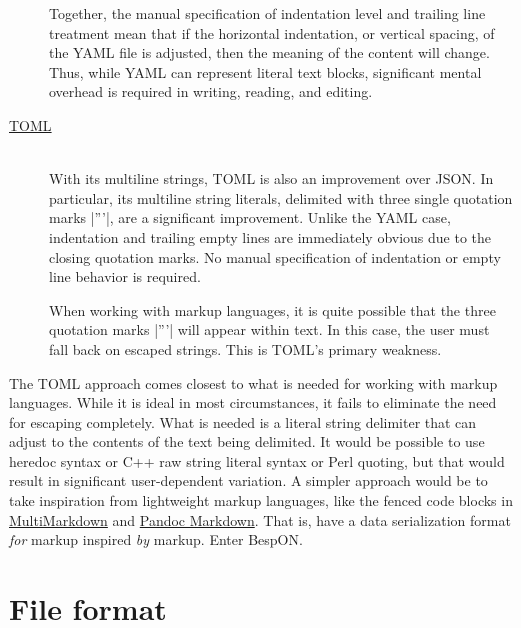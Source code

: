 \documentclass[11pt]{article}
\newcommand{\bespon}{BespON}
\begin{document}
\begin{description}
Together, the manual specification of indentation level and trailing line treatment mean that if the horizontal indentation, or vertical spacing, of the YAML file is adjusted, then the meaning of the content will change.  Thus, while YAML can represent literal text blocks, significant mental overhead is required in writing, reading, and editing.

\item[\href{https://github.com/toml-lang/toml}{TOML}]\hfill\\
With its multiline strings, TOML is also an improvement over JSON.  In particular, its multiline string literals, delimited with three single quotation marks |'''|, are a significant improvement.  Unlike the YAML case, indentation and trailing empty lines are immediately obvious due to the closing quotation marks.  No manual specification of indentation or empty line behavior is required.

When working with markup languages, it is quite possible that the three quotation marks |'''| will appear within text.  In this case, the user must fall back on escaped strings.  This is TOML's primary weakness.
\end{description}

The TOML approach comes closest to what is needed for working with markup languages.  While it is ideal in most circumstances, it fails to eliminate the need for escaping completely.  What is needed is a literal string delimiter that can adjust to the contents of the text being delimited.  It would be possible to use heredoc syntax or C++ raw string literal syntax or Perl quoting, but that would result in significant user-dependent variation.  A simpler approach would be to take inspiration from lightweight markup languages, like the fenced code blocks in \href{http://fletcherpenney.net/multimarkdown/}{MultiMarkdown} and \href{http://pandoc.org/README.html#pandocs-markdown}{Pandoc Markdown}.  That is, have a data serialization format \emph{for} markup inspired \emph{by} markup.  Enter \bespon.


%


\section{File format}
\end{document}

